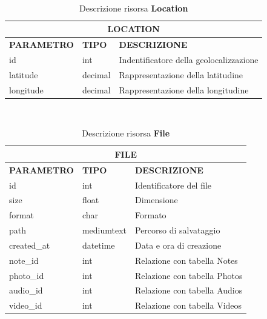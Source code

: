 \ \linebreak
\begin{table}[!h]
\centering
	\begin{tabular}{@{}lll@{}}
		\toprule
		\multicolumn{3}{c}{\textbf{LOCATION}}                         \\ \midrule
		\textbf{PARAMETRO}&\textbf{TIPO}&\textbf{DESCRIZIONE}         \\ \midrule
		id        & int     & Indentificatore della geolocalizzazione \\ 
		latitude  & decimal & Rappresentazione della latitudine       \\ 
		longitude & decimal & Rappresentazione della longitudine      \\ \bottomrule
	\end{tabular}
\caption{Descrizione risorsa \textbf{Location}}\label{tab:locationModel}
\end{table}

\ \linebreak
\begin{table}[!h]
\centering
	\begin{tabular}{@{}lll@{}}
		\toprule
		\multicolumn{3}{c}{\textbf{FILE}}                                                                                     \\ \midrule
		\textbf{PARAMETRO} & \textbf{TIPO} & \textbf{DESCRIZIONE} \\ \midrule
		id                                     & int                               & Identificatore del file                  \\ 
		size                                   & float                             & Dimensione                               \\
		format                                 & char                              & Formato                                  \\
		path                                   & mediumtext                        & Percorso di salvataggio                  \\
		created\_at                            & datetime                          & Data e ora di creazione                  \\
		note\_id                               & int                               & Relazione con tabella Notes               \\
		photo\_id                              & int                               & Relazione con tabella Photos              \\
		audio\_id                              & int                               & Relazione con tabella Audios              \\
		video\_id                              & int                               & Relazione con tabella Videos              \\ \bottomrule
	\end{tabular}
\caption{Descrizione risorsa \textbf{File}}\label{tab:fileModel}
\end{table}

